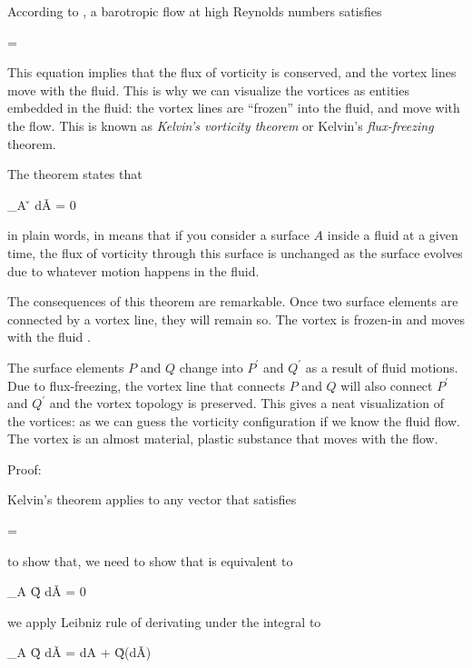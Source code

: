 According to , a barotropic flow at high
Reynolds numbers satisfies

\beq
{} = 
\eeq

This equation implies that the flux of vorticity is conserved, and the
vortex lines move with the fluid. This is why we can visualize the
vortices as entities embedded in the fluid:  the vortex lines are ``frozen'' into the
fluid, and move with the flow. This is known as {\it Kelvin's vorticity
theorem} or Kelvin's {\it flux-freezing} theorem. 

The theorem states that

\beq
{}\int_A \v{\omega} \cdot d\v{A}  = 0 
\eeq

in plain words, in means that if you consider a surface $A$ inside a
fluid at a given time, the flux of vorticity through this surface is
unchanged as the surface evolves due to whatever motion happens in the fluid.

The consequences of this theorem are remarkable. Once two surface
elements are connected by a vortex line, they will remain so. The
vortex is frozen-in and moves with the fluid . 

The surface elements $P$ and $Q$ change into $P^\prime$ and $Q^\prime$ as a
result of fluid motions. Due to flux-freezing, the vortex line that
connects $P$ and $Q$ will also connect $P^\prime$ and $Q^\prime$ and
the vortex topology is preserved. This gives a neat visualization of
the vortices: as we can guess the vorticity configuration if we know the
fluid flow. The vortex is an almost material, plastic substance that
moves with the flow. 

Proof:

Kelvin's theorem applies to any vector that satisfies

\beq
{} = 
\label{eq:kelvin1}
\eeq

to show that, we need to show that  is equivalent to 

\beq
{}\int_A \v{Q} \cdot d\v{A}  = 0 
\eeq

we apply Leibniz rule of derivating under the integral to 

\beq
{}\int_A \v{Q} \cdot d\v{A} = \int {} dA + \v{Q}\cdot{}\left(d\v{A}\right)
\label{eq:kelvin-leib}
\eeq

